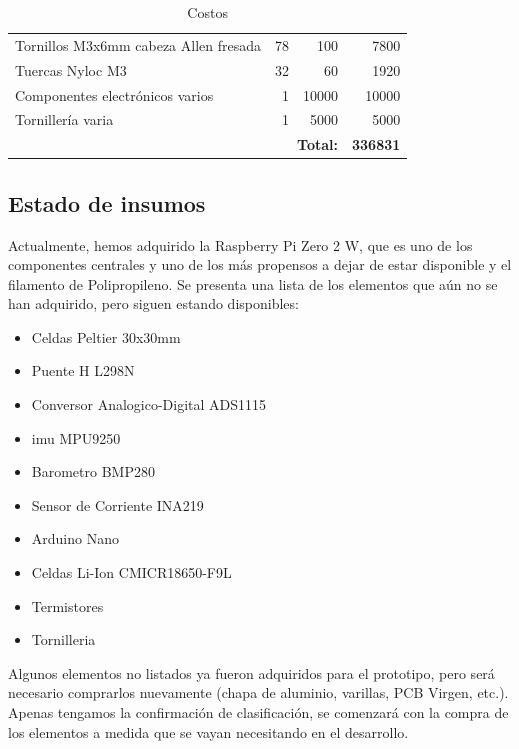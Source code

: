 \begin{table}[H]
\begin{tabular}{|l|r|r|r|}
      Tornillos M3x6mm cabeza Allen fresada           & 78    & 100     & 7800  \\
      Tuercas Nyloc M3                                & 32    & 60      & 1920  \\
      Componentes electrónicos varios                 & 1     & 10000   & 10000 \\
      Tornillería varia                               & 1     & 5000    & 5000  \\
      \hline
      \multicolumn{3}{|r|}{\textbf{Total:}} & \textbf{336831} \\
      \hline
    \end{tabular}
    \caption{Costos}
    \label{tab:costos}
  \end{table}

   \subsection{Estado de insumos}
    Actualmente, hemos adquirido la Raspberry Pi Zero 2 W, que es uno de los componentes centrales y uno de los más
    propensos a dejar de estar disponible y el filamento de Polipropileno. Se presenta una lista de los elementos que
    aún no se han adquirido, pero siguen estando disponibles:
    \begin{itemize}
      \item Celdas Peltier 30x30mm
      \item Puente H L298N
      \item Conversor Analogico-Digital ADS1115
      \item \acrfull{imu} MPU9250
      \item Barometro BMP280
      \item Sensor de Corriente INA219
      \item Arduino Nano
      \item Celdas Li-Ion CMICR18650-F9L
      \item Termistores
      \item Tornilleria
    \end{itemize}

    Algunos elementos no listados ya fueron adquiridos para el prototipo, pero será necesario comprarlos nuevamente
    (chapa de aluminio, varillas, PCB Virgen, etc.). Apenas tengamos la confirmación de clasificación, se comenzará con
    la compra de los elementos a medida que se vayan necesitando en el desarrollo.

